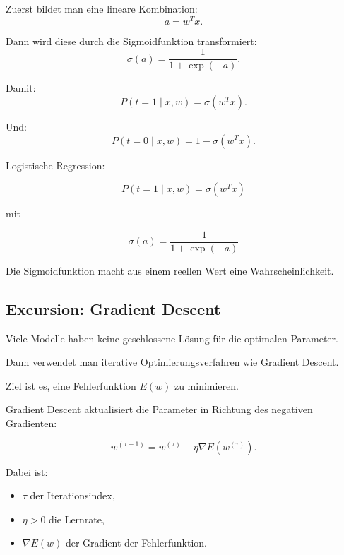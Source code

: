 \documentclass[11pt,a4paper]{scrartcl}
\begin{document}
\begin{calculationbox}
    Zuerst bildet man eine lineare Kombination:
    \[
        a
        =
        w^T x.
    \]

    Dann wird diese durch die Sigmoidfunktion transformiert:
    \[
        \sigma(a)
        =
        \frac{1}{1+\exp(-a)}.
    \]

    Damit:
    \[
        P(t=1 \mid x,w)
        =
        \sigma(w^Tx).
    \]

    Und:
    \[
        P(t=0 \mid x,w)
        =
        1-\sigma(w^Tx).
    \]
\end{calculationbox}

\begin{answerbox}
    Logistische Regression:

    \[
        \boxed{
            P(t=1 \mid x,w)
            =
            \sigma(w^Tx)
        }
    \]

    mit

    \[
        \boxed{
            \sigma(a)
            =
            \frac{1}{1+\exp(-a)}
        }
    \]

    Die Sigmoidfunktion macht aus einem reellen Wert eine Wahrscheinlichkeit.
\end{answerbox}

\subsection{Excursion: Gradient Descent}

\begin{notebox}
    Viele Modelle haben keine geschlossene Lösung für die optimalen Parameter.

    Dann verwendet man iterative Optimierungsverfahren wie Gradient Descent.

    Ziel ist es, eine Fehlerfunktion \(E(w)\) zu minimieren.
\end{notebox}

\begin{calculationbox}
    Gradient Descent aktualisiert die Parameter in Richtung des negativen
    Gradienten:

    \[
        w^{(\tau+1)}
        =
        w^{(\tau)}
        -
        \eta
        \nabla E(w^{(\tau)}).
    \]

    Dabei ist:

    \begin{itemize}
        \item \(\tau\) der Iterationsindex,
        \item \(\eta>0\) die Lernrate,
        \item \(\nabla E(w)\) der Gradient der Fehlerfunktion.
    \end{itemize}
\end{calculationbox}
\end{document}
